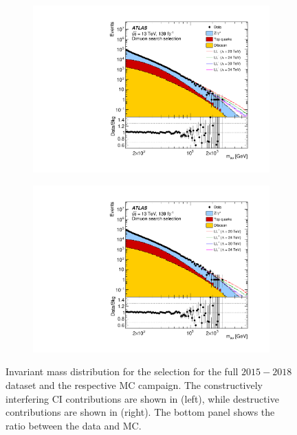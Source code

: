 \begin{figure}[]
    \centering
    \begin{subfigure}[b]{0.49\textwidth}
        \centering
        \includegraphics[width=\textwidth]{figures/analysis/datamc/dataMCcompare/figaux_02a.pdf}
        \label{fig:datamc:mmconst}
    \end{subfigure}
    \begin{subfigure}[b]{0.49\textwidth}
        \centering
        \includegraphics[width=\textwidth]{figures/analysis/datamc/dataMCcompare/figaux_02b.pdf}
        \label{fig:datamc:mmdest}
    \end{subfigure}
    \caption[Invariant mass distributions for \mumu channel]{Invariant mass distribution for the \mumu selection for the full $2015-2018$ dataset and the respective MC campaign. The constructively interfering CI contributions are shown in (left), while destructive contributions are shown in (right). The bottom panel shows the ratio between the data and MC.}
    \label{fig:datamc:mmcompare}
\end{figure}

